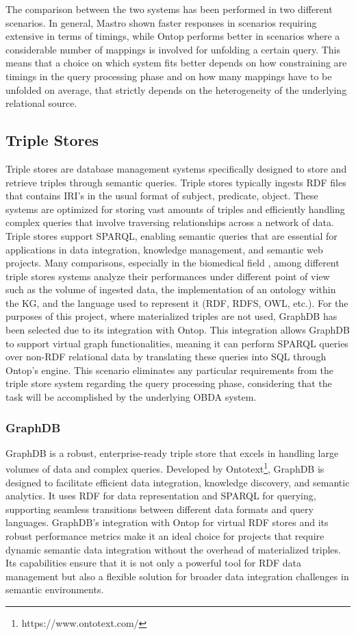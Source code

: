 The comparison between the two systems has been performed in two different scenarios. In general, Mastro shown faster responses in scenarios requiring extensive in terms of timings, while Ontop performs better in scenarios where a considerable number of mappings is involved for unfolding a certain query.
This means that a choice on which system fits better depends on how constraining are timings in the query processing phase and on how many mappings have to be unfolded on average, that strictly depends on the heterogeneity of the underlying relational source.

\subsection{Triple Stores}
Triple stores are database management systems specifically designed to store and retrieve triples through semantic queries. Triple stores typically ingests \ac{RDF} files that contains IRI's in the usual format of subject, predicate, object. These systems are optimized for storing vast amounts of triples and efficiently handling complex queries that involve traversing relationships across a network of data. Triple stores support \ac{SPARQL}, enabling semantic queries that are essential for applications in data integration, knowledge management, and semantic web projects.
Many comparisons, especially in the biomedical field \cite{DBLP:journals/entropy/CanSBU17}, among different triple stores systems analyze their performances under different point of view such as the volume of ingested data, the implementation of an ontology within the \ac{KG}, and the language used to represent it (\ac{RDF}, RDFS, \ac{OWL}, etc.).
For the purposes of this project, where materialized triples are not used, GraphDB has been selected due to its integration with Ontop. This integration allows GraphDB to support virtual graph functionalities, meaning it can perform \ac{SPARQL} queries over non-RDF relational data by translating these queries into \ac{SQL} through Ontop's engine. This scenario eliminates any particular requirements from the triple store system regarding the query processing phase, considering that the task will be accomplished by the underlying \ac{OBDA} system.

\subsubsection{GraphDB}
GraphDB is a robust, enterprise-ready triple store that excels in handling large volumes of data and complex queries. Developed by Ontotext\footnote{https://www.ontotext.com/}, GraphDB is designed to facilitate efficient data integration, knowledge discovery, and semantic analytics. It uses \ac{RDF} for data representation and \ac{SPARQL} for querying, supporting seamless transitions between different data formats and query languages.
GraphDB's integration with Ontop for virtual \ac{RDF} stores and its robust performance metrics make it an ideal choice for projects that require dynamic semantic data integration without the overhead of materialized triples. Its capabilities ensure that it is not only a powerful tool for \ac{RDF} data management but also a flexible solution for broader data integration challenges in semantic environments.